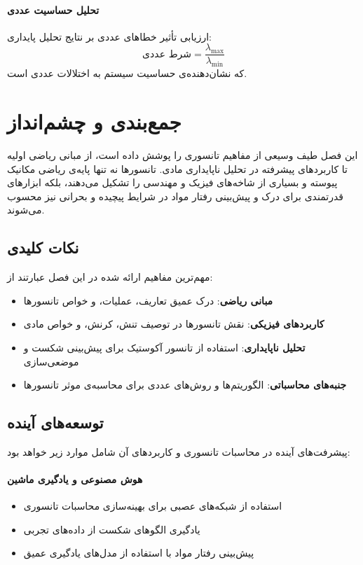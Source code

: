 \paragraph{تحلیل حساسیت عددی}
ارزیابی تأثیر خطاهای عددی بر نتایج تحلیل پایداری:
\begin{equation}
    \text{شرط عددی} = \frac{\lambda_{\max}}{\lambda_{\min}}
\end{equation}
که نشان‌دهنده‌ی حساسیت سیستم به اختلالات عددی است.




\section{جمع‌بندی و چشم‌انداز}

این فصل طیف وسیعی از مفاهیم تانسوری را پوشش داده است، از مبانی ریاضی اولیه تا کاربردهای پیشرفته در تحلیل ناپایداری مادی. تانسورها نه تنها پایه‌ی ریاضی مکانیک پیوسته و بسیاری از شاخه‌های فیزیک و مهندسی را تشکیل می‌دهند، بلکه ابزارهای قدرتمندی برای درک و پیش‌بینی رفتار مواد در شرایط پیچیده و بحرانی نیز محسوب می‌شوند.

\subsection{نکات کلیدی}
مهم‌ترین مفاهیم ارائه شده در این فصل عبارتند از:

\begin{itemize}
    \item \textbf{مبانی ریاضی}: درک عمیق تعاریف، عملیات، و خواص تانسورها
    \item \textbf{کاربردهای فیزیکی}: نقش تانسورها در توصیف تنش، کرنش، و خواص مادی
    \item \textbf{تحلیل ناپایداری}: استفاده از تانسور آکوستیک برای پیش‌بینی شکست و موضعی‌سازی
    \item \textbf{جنبه‌های محاسباتی}: الگوریتم‌ها و روش‌های عددی برای محاسبه‌ی موثر تانسورها
\end{itemize}

\subsection{توسعه‌های آینده}
پیشرفت‌های آینده در محاسبات تانسوری و کاربردهای آن شامل موارد زیر خواهد بود:

\paragraph{هوش مصنوعی و یادگیری ماشین}
\begin{itemize}
    \item استفاده از شبکه‌های عصبی برای بهینه‌سازی محاسبات تانسوری
    \item یادگیری الگوهای شکست از داده‌های تجربی
    \item پیش‌بینی رفتار مواد با استفاده از مدل‌های یادگیری عمیق
\end{itemize}

